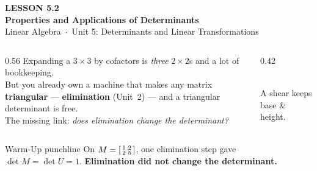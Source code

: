 \documentclass[aspectratio=169, 11pt]{beamer}
\begin{document}
{
\begin{frame}[plain]
  \vspace{2.8cm}\hspace{0.55cm}%
  \begin{minipage}{0.9\textwidth}
    {\color{goldacc}\bfseries\small LESSON 5.2}\\[0.5cm]
    {\color{white}\bfseries\LARGE Properties and Applications of Determinants}\\[1.0cm]
    {\color{blushmid}\small Linear Algebra~$\cdot$~Unit 5: Determinants and Linear Transformations}
  \end{minipage}
\end{frame}
}

\begin{frame}[t, plain]
  \begin{columns}[T]
    \begin{column}{0.56\textwidth}
      Expanding a $3\times3$ by cofactors is \emph{three} $2\times2$s and a lot of bookkeeping.\\[8pt]
      But you already own a machine that makes any matrix \textbf{triangular} --- \textbf{elimination}
      (Unit~2) --- and a triangular determinant is free.\\[8pt]
      The missing link: \emph{does elimination change the determinant?}
    \end{column}
    \begin{column}{0.42\textwidth}
      \centering
      \\[4pt]
      {\scriptsize A shear keeps base \& height.}
    \end{column}
  \end{columns}
  \vspace{2pt}
  \begin{block}{Warm-Up punchline}
    On $M=\begin{bsmallmatrix} 1 & 2\\ 2 & 5 \end{bsmallmatrix}$, one elimination step gave $\det M=\det U=1$.
    \textbf{Elimination did not change the determinant.}
  \end{block}
\end{frame}
\end{document}
